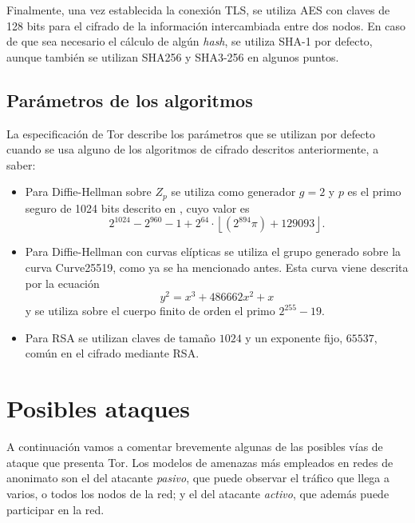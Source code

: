 \documentclass[
  a4paper,
  12pt,
  spanish,
]{scrartcl}
\begin{document}
Finalmente, una vez establecida la conexión TLS, se utiliza AES con claves de 128 bits para el cifrado de la información intercambiada entre dos nodos. En caso de que sea necesario el cálculo de algún \textit{hash}, se utiliza SHA-1 por defecto, aunque también se utilizan SHA256 y SHA3-256 en algunos puntos.

\subsection{Parámetros de los algoritmos}

La especificación de Tor describe los parámetros que se utilizan por defecto cuando se usa alguno de los algoritmos de cifrado descritos anteriormente, a saber: \begin{itemize}
  \item Para Diffie-Hellman sobre \(Z_p\) se utiliza como generador \(g=2\) y \(p\) es el primo seguro de 1024 bits descrito en \parencite{carrel_internet_1998}, cuyo valor es \[
    2^{1024} - 2^{960} - 1 + 2^{64} \cdot \left\lfloor (2^{894} \pi) + 129093 \right\rfloor.
  \]
  \item Para Diffie-Hellman con curvas elípticas se utiliza el grupo generado sobre la curva Curve25519, como ya se ha mencionado antes. Esta curva viene descrita por la ecuación \[
    y^{2}=x^{3}+486662x^{2}+x
  \]
  y se utiliza sobre el cuerpo finito de orden el primo \(2^{255}-19\).
  \item Para RSA se utilizan claves de tamaño \(1024\) y un exponente fijo, \(65537\), común en el cifrado mediante RSA.
\end{itemize}

\section{Posibles ataques}
\label{sec:ataques}
A continuación vamos a comentar brevemente algunas de las posibles vías de ataque que presenta Tor.
Los modelos de amenazas más empleados en redes de anonimato son el del atacante \emph{pasivo},
que puede observar el tráfico que llega a varios, o todos los nodos de la red; y el del
atacante \emph{activo}, que además puede participar en la red.
\end{document}
